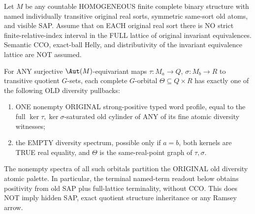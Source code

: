 \begin{lemma}
\label{lem:typed-complete-orbital-positive-NR2-SAP}
Let $M$ be any countable HOMOGENEOUS finite complete
binary structure with named individually transitive
original real sorts, symmetric same-sort old atoms,
and visible SAP. Assume that on EACH original
real sort there is NO strict finite-relative-index
interval in the FULL lattice of original
invariant equivalences.  Semantic CCO, exact-ball
Helly, and distributivity of the invariant
equivalence lattice are NOT assumed.

For ANY surjective $\Aut(M)$-equivariant maps
$\tau:M_a\to Q$, $\sigma:M_b\to R$
to transitive quotient $G$-sets,
each complete $G$-orbital $\Theta\subseteq Q\times R$
has exactly one of the following OLD diversity
pullbacks:
\begin{enumerate}[label=(\roman*)]
\item ONE nonempty ORIGINAL strong-positive typed
word profile, equal to the full
$\ker\tau,\ker\sigma$-saturated old cylinder
of ANY of its fine atomic diversity witnesses;
\item the EMPTY diversity spectrum, possible
only if $a=b$, both kernels are TRUE real
equality, and $\Theta$ is the same-real-point
graph of $\tau,\sigma$.
\end{enumerate}
The nonempty spectra of all such orbitals partition
the ORIGINAL old diversity atomic palette.
In particular, the terminal named-term readout below obtains
positivity from old SAP plus full-lattice terminality,
without CCO. This does NOT imply hidden SAP, exact
quotient structure inheritance or any Ramsey arrow.
\end{lemma}
